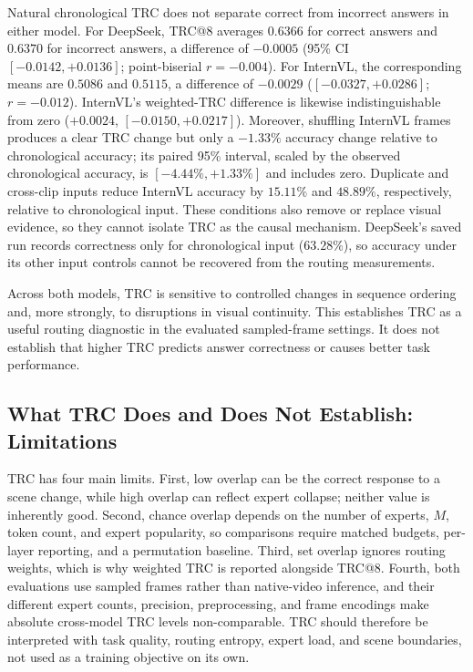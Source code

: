 \documentclass[10pt]{article}
\newenvironment{reviewchange}{\begingroup\color{red}}{\endgroup}
\begin{document}
\begin{reviewchange}
\begin{reviewchange}
Natural chronological TRC does not separate correct from incorrect answers in either
model.  For DeepSeek, TRC@8 averages $0.6366$ for correct answers and $0.6370$ for
incorrect answers, a difference of $-0.0005$ (95\% CI $[-0.0142,+0.0136]$;
point-biserial $r=-0.004$).  For InternVL, the corresponding means are $0.5086$ and
$0.5115$, a difference of $-0.0029$ ($[-0.0327,+0.0286]$; $r=-0.012$).  InternVL's
weighted-TRC difference is likewise indistinguishable from zero ($+0.0024$,
$[-0.0150,+0.0217]$).  Moreover, shuffling InternVL frames produces a clear TRC change
but only a $-1.33\%$ accuracy change relative to chronological accuracy; its paired
95\% interval, scaled by the observed chronological accuracy, is
$[-4.44\%,+1.33\%]$ and includes zero.  Duplicate and cross-clip inputs reduce
InternVL accuracy by $15.11\%$ and $48.89\%$, respectively, relative to chronological
input.  These conditions also remove or replace visual evidence, so they cannot
isolate TRC as the causal mechanism.  DeepSeek's saved run records correctness only
for chronological input ($63.28\%$), so accuracy under its other input controls
cannot be recovered from the routing measurements.

Across both models, TRC is sensitive to controlled changes in sequence ordering and,
more strongly, to disruptions in visual continuity.  This establishes TRC as a useful
routing diagnostic in the evaluated sampled-frame settings.  It does not establish
that higher TRC predicts answer correctness or causes better task performance.
\end{reviewchange}




\subsection{What TRC Does and Does Not Establish: Limitations}
\label{sec:trc-limitations}

TRC has four main limits.  First, low overlap can be the correct response to a scene
change, while high overlap can reflect expert collapse; neither value is inherently
good.  Second, chance overlap depends on the number of experts, $M$, token count, and
expert popularity, so comparisons require matched budgets, per-layer reporting, and a
permutation baseline.  Third, set overlap ignores routing weights, which is why weighted
TRC is reported alongside TRC@8.  Fourth, both evaluations use sampled frames rather
than native-video inference, and their different expert counts, precision, preprocessing,
and frame encodings make absolute cross-model TRC levels non-comparable.  TRC should
therefore be interpreted with task quality, routing entropy, expert load, and scene
boundaries, not used as a training objective on its own.

\end{reviewchange}
\end{document}

